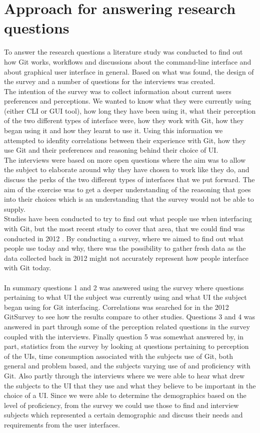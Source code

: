 \documentclass[a4paper,oneside]{bth} %
\begin{document}
			\section{Approach for answering research questions}
			To answer the research questions a literature study was conducted to find out how Git works, workflows and discussions about the command-line interface and about graphical user interface in general. Based on what was found, the design of the survey and a number of questions for the interviews was created.\\
			The intention of the survey was to collect information about current users preferences and perceptions. We wanted to know what they were currently using (either CLI or GUI tool), how long they have been using it, what their perception of the two different types of interface were, how they work with Git, how they began using it and how they learnt to use it. 
			Using this information we attempted to idenfity correlations between their experience with Git, how they use Git and their preferences and reasoning behind their choice of UI.\\
			The interviews were based on more open questions where the aim was to allow the subject to elaborate around why they have chosen to work like they do, and discuss the perks of the two different types of interfaces that we put forward. The aim of the exercise was to get a deeper understanding of the reasoning that goes into their choices which is an understanding that the survey would not be able to supply.\\
			Studies have been conducted to try to find out what people use when interfacing with Git, but the most recent study to cover that area, that we could find was conducted in 2012 \cite{GitUserSurvey}.
			By conducting a survey, where we aimed to find out what people use today and why, there was the possibility to gather fresh data as the data collected back in 2012 might not accurately represent how people interface with Git today.
			\\\\
			In summary questions 1 and 2 was answered using the survey where questions pertaining to what UI the subject was currently using and what UI the subject began using for Git interfacing. Correlations was searched for in the 2012 GitSurvey \cite{GitUserSurvey} to see how the results compare to other studies.
			Questions 3 and 4 was answered in part through some of the perception related questions in the survey coupled with the interviews. Finally question 5 was somewhat answered by, in part, statistics from the survey by looking at questions pertaining to perception of the UIs, time consumption associated with the subjects use of Git, both general and problem based, and the subjects varying use of and proficiency with Git. Also partly through the interviews where we were able to hear what drew the subjects to the UI that they use and what they believe to be important in the choice of a UI. Since we were able to determine the demographics based on the level of proficiency, from the survey we could use those to find and interview subjects which represented a certain demographic and discuss their needs and requirements from the user interfaces. 
\end{document}
